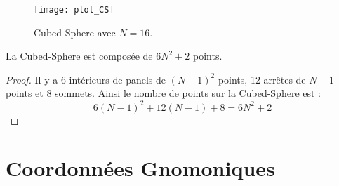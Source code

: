 \begin{figure}
\begin{center}
\texttt{[image: plot\_CS]}
\end{center}
\caption{Cubed-Sphere avec $N=16$.}
\end{figure}





\begin{proposition}
La Cubed-Sphere est composée de $6N^2 +2$ points.
\end{proposition}

\begin{proof}
Il y a 6 intérieurs de panels de $(N-1)^2$ points, 12 arrêtes de $N-1$ points et 8 sommets. Ainsi le nombre de points sur la Cubed-Sphere est :
$$
6 (N-1)^2 + 12 (N-1)+8=6N^2+2
$$
\end{proof}











\section{Coordonnées Gnomoniques}

